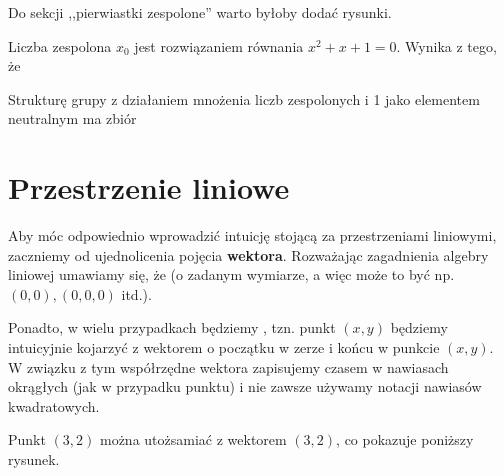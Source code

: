 
\begin{editorsnote}
    Do sekcji ,,pierwiastki zespolone'' warto byłoby dodać rysunki.
\end{editorsnote}

\begin{problems}
    \prob Liczba zespolona $x_0$ jest rozwiązaniem równania $x^2 + x + 1 = 0$. Wynika z tego, że

    \prob Strukturę grupy z działaniem mnożenia liczb zespolonych i 1 jako elementem neutralnym ma zbiór
\end{problems}

\section{Przestrzenie liniowe}

Aby móc odpowiednio wprowadzić intuicję stojącą za przestrzeniami liniowymi, zaczniemy od ujednolicenia pojęcia \textbf{wektora}. Rozważając zagadnienia algebry liniowej umawiamy się, że  (o zadanym wymiarze, a więc może to być np. $(0, 0), (0, 0, 0)$ itd.).

Ponadto, w wielu przypadkach będziemy , tzn. punkt $(x, y)$ będziemy intuicyjnie kojarzyć z wektorem o początku w zerze i końcu w punkcie $(x, y)$. W związku z tym współrzędne wektora zapisujemy czasem w nawiasach okrągłych (jak w przypadku punktu) i nie zawsze używamy notacji nawiasów kwadratowych.

\begin{example}
	Punkt $(3, 2)$ można utożsamiać z wektorem $(3, 2)$, co pokazuje poniższy rysunek.
	
	\begin{center}
	\end{center}
\end{example}

